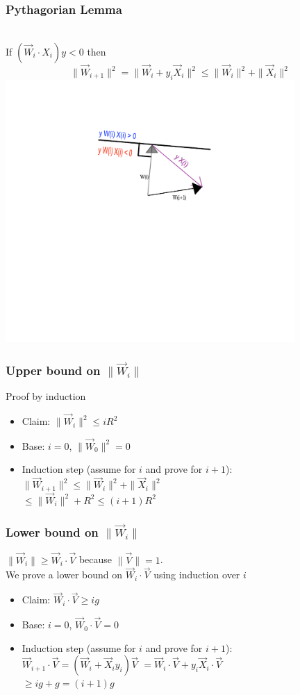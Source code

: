 \documentclass{beamer}
\newcommand{\W}{\vec{W}}
\newcommand{\V}{\vec{V}}
\newcommand{\X}{\vec{X}}
\begin{document}
\begin{frame}
\frametitle{Pythagorian Lemma}
~\\
If $(\W_i \cdot X_i) y <0$ then\\
\pause
\[
\| \W_{i+1} \|^2 = \|\W_i + y_i \X_i\|^2 \leq \|\W_i\|^2 + \|\X_i\|^2 
\]
\pause
\includegraphics[height=10cm]{PerceptronAnim/PerceptronError.pdf}
\end{frame}

\begin{frame}
\frametitle{Upper bound on $\| \W_i \|$}
\pause
Proof by induction
\begin{itemize}
\item Claim: $ \| \W_{i} \|^2 \leq i R^2 $
\item Base: $i=0$, $\|\W_0\|^2 = 0$
\item Induction step (assume for $i$ and prove for $i+1$):\\
$ \| \W_{i+1} \|^2 \leq \|\W_i\|^2 + \|\X_i\|^2 $ \\
$\leq \|\W_i\|^2 + R^2 \leq (i+1) R^2$

\end{itemize}
\end{frame}

\begin{frame}
\frametitle{Lower bound on $\| \W_i \|$}
\pause
$\|\W_i\| \geq \W_{i} \cdot \V$ because $\| \V \|=1$.\\
\pause
We prove a lower bound on $\W_{i} \cdot \V$ using induction over $i$
\begin{itemize}
\item Claim: $ \W_{i} \cdot \V \geq i g $
\item Base: $i=0$, $\W_0 \cdot \V = 0$
\item Induction step (assume for $i$ and prove for $i+1$):\\
$ \W_{i+1} \cdot \V  = \left( \W_i + \X_i y_i \right) \V$
\pause
$= \W_i \cdot \V + y_i \X_i \cdot \V$ \\
$\geq i g + g = (i+1) g$
\end{itemize}
\end{frame}
\end{document}
